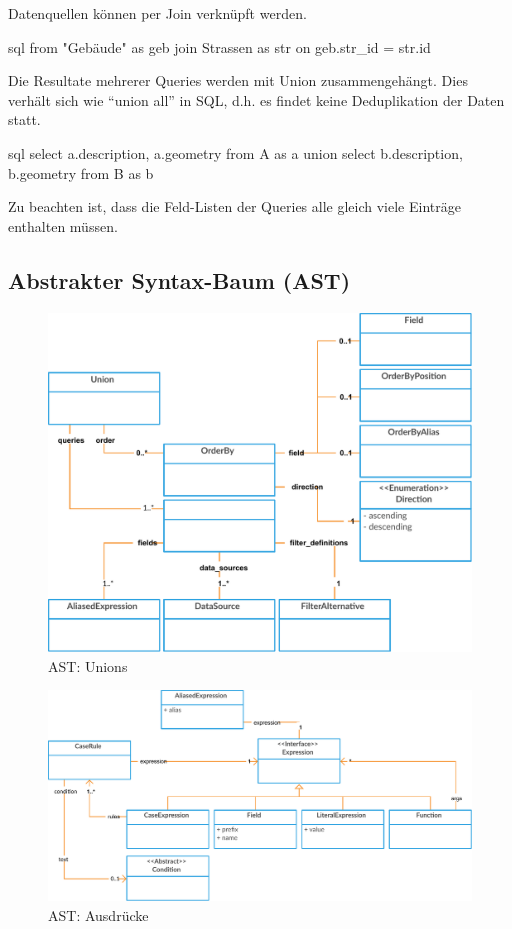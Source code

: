 Datenquellen können per Join verknüpft werden.
\begin{src}{sql}
  from "Gebäude" as geb join Strassen as str on geb.str_id = str.id
\end{src}

Die Resultate mehrerer Queries werden mit Union zusammengehängt. Dies verhält sich wie ``union all'' in SQL, d.h. es findet keine Deduplikation der Daten statt.
\begin{src}{sql}
  select a.description, a.geometry from A as a
   union
  select b.description, b.geometry from B as b
\end{src}
Zu beachten ist, dass die Feld-Listen der Queries alle gleich viele Einträge enthalten müssen.
\newline

\subsection{Abstrakter Syntax-Baum (AST)}

\begin{figure}[H]
\centering
\includegraphics[width=0.8\linewidth]{fig/odhql-ast-union.pdf}
\caption{AST: Unions}
\label{fig:pd:odhql-flow}
\end{figure}

\begin{figure}[H]
\centering
\includegraphics[width=0.8\linewidth]{fig/odhql-ast-expression.pdf}
\caption{AST: Ausdrücke}
\label{fig:pd:odhql-flow}
\end{figure}

